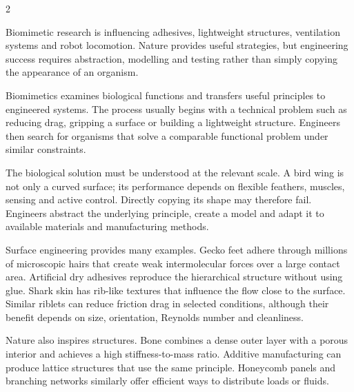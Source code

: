 

\begin{multicols}{2}
\begin{engineeringnews}
Biomimetic research is influencing adhesives, lightweight structures, ventilation systems and robot
locomotion. Nature provides useful strategies, but engineering success requires abstraction,
modelling and testing rather than simply copying the appearance of an organism.
\end{engineeringnews}

\begin{ecarticle}
Biomimetics examines biological functions and transfers useful principles to engineered systems. The
process usually begins with a technical problem such as reducing drag, gripping a surface or
building a lightweight structure. Engineers then search for organisms that solve a comparable
functional problem under similar constraints.

The biological solution must be understood at the relevant scale. A bird wing is not only a curved
surface; its performance depends on flexible feathers, muscles, sensing and active control. Directly
copying its shape may therefore fail. Engineers abstract the underlying principle, create a model and
adapt it to available materials and manufacturing methods.

Surface engineering provides many examples. Gecko feet adhere through millions of microscopic hairs
that create weak intermolecular forces over a large contact area. Artificial dry adhesives reproduce
the hierarchical structure without using glue. Shark skin has rib-like textures that influence the
flow close to the surface. Similar riblets can reduce friction drag in selected conditions, although
their benefit depends on size, orientation, Reynolds number and cleanliness.

Nature also inspires structures. Bone combines a dense outer layer with a porous interior and
achieves a high stiffness-to-mass ratio. Additive manufacturing can produce lattice structures that
use the same principle. Honeycomb panels and branching networks similarly offer efficient ways to
distribute loads or fluids.


\end{ecarticle}
\end{multicols}
